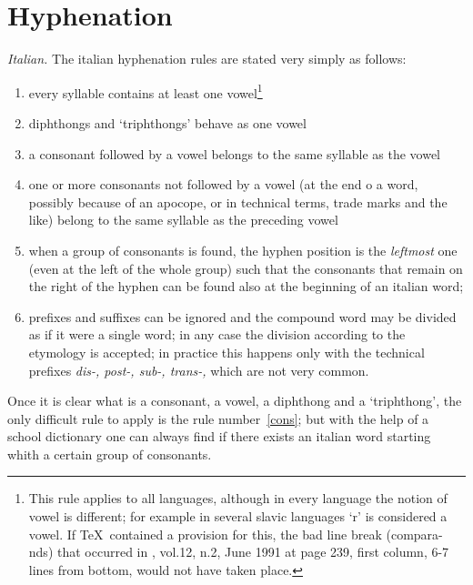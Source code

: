 \documentclass{ltugboat}
\begin{document}
\section{Hyphenation}
{\it Italian.} The italian hyphenation rules are stated very simply as follows:
\begin{enumerate}

\item  every syllable contains at least one vowel\footnote{This rule applies
to all languages,  although  in  every  language  the  notion  of  vowel  is
different;  for  example  in  several  slavic  languages `r' is considered a
vowel. If  \TeX\  contained  a  provision  for  this,  the  bad  line  break
(compara-nds)  that  occurred  in  \TUB, vol.12, n.2, June 1991 at page 239,
first column, 6-7 lines from bottom, would not have taken place.}

\item diphthongs and `triphthongs' behave as one vowel

\item  a  consonant  followed by a vowel belongs to the same syllable as the
vowel

\item  one  or more consonants not followed by a vowel (at the end o a word,
possibly because of an apocope, or in technical terms, trade marks  and  the
like) belong to the same syllable as the preceding vowel

\item  when  a group of consonants is found, the hyphen position is the {\it
leftmost} one (even at the left of the whole group) such that the consonants
that remain on the right of the hyphen can be found also at the beginning of
an italian word;\label{cons}

\item  prefixes  and  suffixes  can  be ignored and the compound word may be
divided as if it were a single word; in any case the division  according  to
the  etymology is accepted; in practice this happens only with the technical
prefixes {\it dis-, post-, sub-, trans-,} which are not very common.

\end{enumerate}

Once  it  is  clear  what  is  a  consonant,  a  vowel,  a  diphthong  and a
`triphthong',  the  only  difficult  rule   to    apply    is    the    rule
number~\ref{cons};  but  with the help of a school dictionary one can always
find if there exists an italian word  starting  whith  a  certain  group  of
consonants.
\end{document}
